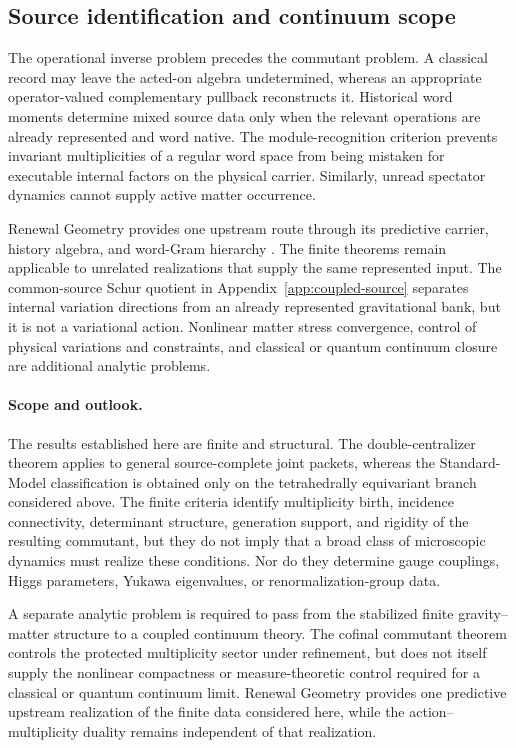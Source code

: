 \documentclass[11pt]{article}
\numberwithin{equation}{section}
\theoremstyle{definition}
\theoremstyle{remark}
\begin{document}
\subsection{Source identification and continuum scope}

The operational inverse problem precedes the commutant problem.  A classical
record may leave the acted-on algebra undetermined, whereas an appropriate
operator-valued complementary pullback reconstructs it.  Historical word
moments determine mixed source data only when the relevant operations are
already represented and word native.  The module-recognition criterion
prevents invariant multiplicities of a regular word space from being
mistaken for executable internal factors on the physical carrier.  Similarly,
unread spectator dynamics cannot supply active matter occurrence.

Renewal Geometry provides one upstream route through its predictive carrier,
history algebra, and word-Gram hierarchy
\cite{PelissierSpacetime2026,PelissierSpectral2026}.  The finite theorems
remain applicable to unrelated realizations that supply the same represented
input.  The common-source Schur quotient in Appendix~\ref{app:coupled-source}
separates internal variation directions from an already represented
gravitational bank, but it is not a variational action.  Nonlinear matter
stress convergence, control of physical variations and constraints, and
classical or quantum continuum closure are additional analytic problems.

\paragraph{Scope and outlook.}

The results established here are finite and structural.  The
double-centralizer theorem applies to general source-complete joint packets,
whereas the Standard-Model classification is obtained only on the
tetrahedrally equivariant branch considered above.  The finite criteria
identify multiplicity birth, incidence connectivity, determinant structure,
generation support, and rigidity of the resulting commutant, but they do not
imply that a broad class of microscopic dynamics must realize these
conditions.  Nor do they determine gauge couplings, Higgs parameters, Yukawa
eigenvalues, or renormalization-group data.

A separate analytic problem is required to pass from the stabilized finite
gravity--matter structure to a coupled continuum theory.  The cofinal
commutant theorem controls the protected multiplicity sector under
refinement, but does not itself supply the nonlinear compactness or
measure-theoretic control required for a classical or quantum continuum
limit.  Renewal Geometry
\cite{PelissierSpacetime2026,PelissierSpectral2026} provides one predictive
upstream realization of the finite data considered here, while the
action--multiplicity duality remains independent of that realization.
\end{document}
